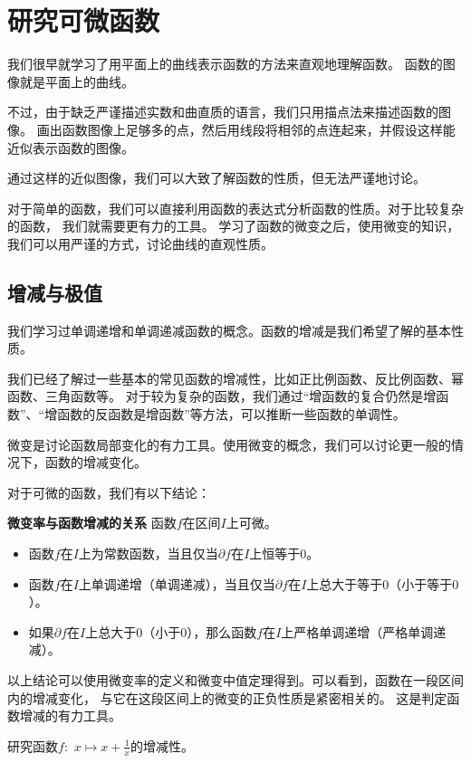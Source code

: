 \documentclass[12pt,UTF8,fontset=none]{ctexbook}
\begin{document}
\chapter{研究可微函数}

我们很早就学习了用平面上的曲线表示函数的方法来直观地理解函数。
函数的图像就是平面上的曲线。

不过，由于缺乏严谨描述实数和曲直质的语言，我们只用描点法来描述函数的图像。
画出函数图像上足够多的点，然后用线段将相邻的点连起来，并假设这样能近似表示函数的图像。

通过这样的近似图像，我们可以大致了解函数的性质，但无法严谨地讨论。

对于简单的函数，我们可以直接利用函数的表达式分析函数的性质。对于比较复杂的函数，
我们就需要更有力的工具。
学习了函数的微变之后，使用微变的知识，我们可以用严谨的方式，讨论曲线的直观性质。

\section{增减与极值}

我们学习过单调递增和单调递减函数的概念。函数的增减是我们希望了解的基本性质。

我们已经了解过一些基本的常见函数的增减性，比如正比例函数、反比例函数、幂函数、三角函数等。
对于较为复杂的函数，我们通过“增函数的复合仍然是增函数”、“增函数的反函数是增函数”等方法，可以推断一些函数的单调性。

微变是讨论函数局部变化的有力工具。使用微变的概念，我们可以讨论更一般的情况下，函数的增减变化。

对于可微的函数，我们有以下结论：
\begin{tm}{\textbf{微变率与函数增减的关系}}\label{tm:3-1-0}
    函数$f$在区间$I$上可微。
    \begin{itemize}
        \item 函数$f$在$I$上为常数函数，当且仅当$\partial f$在$I$上恒等于$0$。
        \item 函数$f$在$I$上单调递增（单调递减），当且仅当$\partial f$在$I$上总大于等于$0$（小于等于$0$）。
        \item 如果$\partial f$在$I$上总大于$0$（小于$0$），那么函数$f$在$I$上严格单调递增（严格单调递减）。
    \end{itemize} 
\end{tm}
以上结论可以使用微变率的定义和微变中值定理得到。可以看到，函数在一段区间内的增减变化，
与它在这段区间上的微变的正负性质是紧密相关的。
这是判定函数增减的有力工具。

\begin{et}
    研究函数$f:\,\,x\mapsto x + \frac{1}{x}$的增减性。
\end{et}
\end{document}
